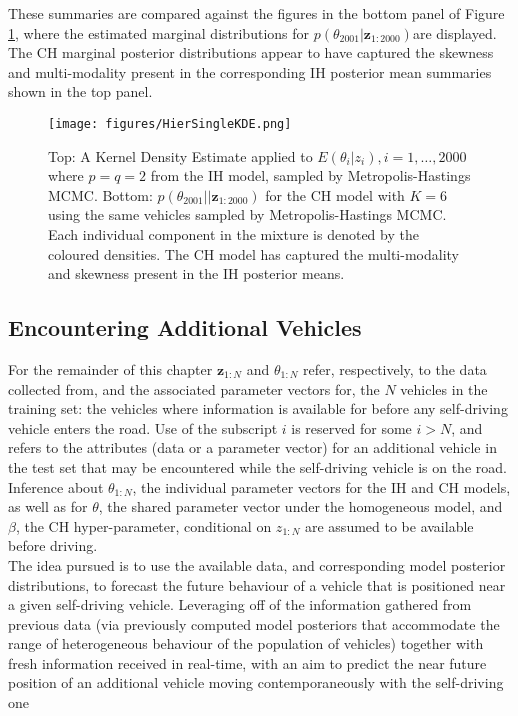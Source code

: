 \documentclass[
12pt, %
onehalfspacing, %
nohyperref, %
headsepline, %
chapterinoneline, %
]{MastersDoctoralThesis} %
\begin{document}
These summaries are compared against the figures in the bottom panel of Figure \ref{fig:carsHierSingleKDE}, where the estimated marginal distributions for $p(\theta_{2001} | \textbf{z}_{1:2000})$are displayed. The CH marginal posterior distributions appear to have captured the skewness and multi-modality present in the corresponding IH posterior mean summaries shown in the top panel. 
\begin{figure}[htbp]
\centering
\texttt{[image: figures/HierSingleKDE.png]}
\caption{Top: A Kernel Density Estimate applied to $E(\theta_i | z_i), i = 1, \ldots, 2000$ where $p = q = 2$ from the IH model, sampled by Metropolis-Hastings MCMC. Bottom: $p(\theta_{2001}| | \textbf{z}_{1:2000})$ for the CH model with $K = 6$ using the same vehicles sampled by Metropolis-Hastings MCMC. Each individual component in the mixture is denoted by the coloured densities. The CH model has captured the multi-modality and skewness present in the IH posterior means.}
\label{fig:carsHierSingleKDE}
\end{figure}

\subsection{Encountering Additional Vehicles}
\label{subsec:carsadditionalVehicles}

For the remainder of this chapter $\textbf{z}_{1:N}$ and $\theta_{1:N}$ refer, respectively, to the data collected from, and the associated parameter vectors for, the $N$ vehicles in the training set: the vehicles where information is available for before any self-driving vehicle enters the road. Use of the subscript $i$ is reserved for some $i > N$, and refers to the attributes (data or a parameter vector) for an additional vehicle in the test set that may be encountered while the self-driving vehicle is on the road. Inference about $\theta_{1:N}$, the individual parameter vectors for the IH and CH models, as well as for $\theta$, the shared parameter vector under the homogeneous model, and $\beta$, the CH hyper-parameter, conditional on $z_{1:N}$ are assumed to be available before driving.
\\

The idea pursued is to use the available data, and corresponding model posterior distributions, to forecast the future behaviour of a vehicle that is positioned near a given self-driving vehicle. Leveraging off of the information gathered from previous data (via previously computed model posteriors that accommodate the range of heterogeneous behaviour of the population of vehicles) together with fresh information received in real-time, with an aim to predict the near future position of an additional vehicle moving contemporaneously with the self-driving one
\\
\end{document}
